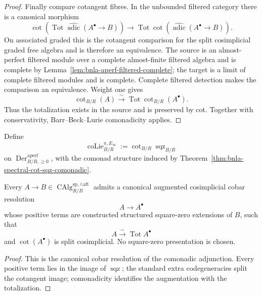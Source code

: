 \begin{proof}
Finally compare cotangent fibres.  In the unbounded filtered category there is
a canonical morphism
\[
    \operatorname{cot}
    \left(
      \operatorname*{Tot}
      \widehat{\operatorname{adic}}(A^\bullet\to B)
    \right)
    \longrightarrow
    \operatorname*{Tot}
    \operatorname{cot}
    \left(
      \widehat{\operatorname{adic}}(A^\bullet\to B)
    \right).
\]
On associated graded this is the cotangent comparison for the split
cosimplicial graded free algebra and is therefore an equivalence.  The source
is an almost-perfect filtered module over a complete almost-finite filtered
algebra and is complete by
Lemma~\ref{lem:bnla-aperf-filtered-complete}; the target is a
limit of complete filtered modules and is complete.  Complete filtered
detection makes the comparison an equivalence.  Weight one gives
\[
    \operatorname{cot}_{B/R}(A)
    \xrightarrow{\sim}
    \operatorname*{Tot}
    \operatorname{cot}_{B/R}(A^\bullet).
\]
Thus the totalization exists in the source and is preserved by cot.  Together
with conservativity, Barr--Beck--Lurie comonadicity applies.
\end{proof}

\begin{definition}
\label{def:bnla-spectral-colie}
Define
\[
    \operatorname{coLie}^{\pi,E_\infty}_{B/R}
    :=
    \operatorname{cot}_{B/R}\operatorname{sqz}_{B/R}
\]
on $\operatorname{Der}^{\mathrm{aperf}}_{B/R,\geq0}$, with the comonad
structure induced by Theorem~\ref{thm:bnla-spectral-cot-sqz-comonadic}.
\end{definition}

\begin{corollary}
\label{cor:bnla-spectral-square-zero-resolution}
Every
$A\to B\in\operatorname{CAlg}^{\mathrm{sp},\wedge\mathrm{aft}}_{R/B}$
admits a canonical augmented cosimplicial cobar resolution
\[
    A\longrightarrow A^\bullet
\]
whose positive terms are constructed structured square-zero extensions of
$B$, such that
\[
    A\xrightarrow{\sim}\operatorname*{Tot}A^\bullet
\]
and $\operatorname{cot}(A^\bullet)$ is split cosimplicial.  No square-zero
presentation is chosen.
\end{corollary}

\begin{proof}
This is the canonical cobar resolution of the comonadic adjunction.  Every
positive term lies in the image of $\operatorname{sqz}$; the standard extra
codegeneracies split the cotangent image; comonadicity identifies the
augmentation with the totalization.
\end{proof}

